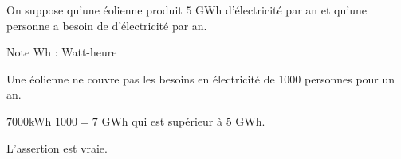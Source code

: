 \begin{exercice*}
    On suppose qu'une éolienne produit $5$ GWh d'électricité par an et qu'une
    personne a besoin de  d'électricité par an.

    \begin{myBox}{Note}
        Wh : Watt-heure
    \end{myBox}

    Une éolienne ne couvre pas les besoins en électricité de $\num{1000}$ personnes pour un an.
\end{exercice*}
\begin{corrige}
    $\num{7000}$kWh \times $\num{1000}=7$ GWh qui est supérieur à $5$ GWh.
    
    L'assertion est vraie.
\end{corrige}

